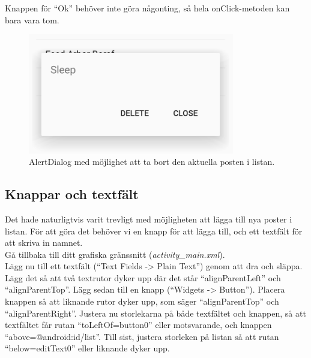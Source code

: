 \documentclass[11 pt, titlepage]{article} %
\begin{document}
Knappen för “Ok” behöver inte göra någonting, så hela onClick-metoden kan bara vara tom.\\

\begin{figure}[ht!]

\centering

\includegraphics[width=90mm]{images/popup.png}

\caption{AlertDialog med möjlighet att ta bort den aktuella posten i listan.}

\label{overflow}

\end{figure}


\subsection{Knappar och textfält}
Det hade naturligtvis varit trevligt med möjligheten att lägga till nya poster i listan.
För att göra det behöver vi en knapp för att lägga till, och ett textfält för att skriva in namnet.\\

Gå tillbaka till ditt grafiska gränssnitt (\textit{activity\_main.xml}).\\
Lägg nu till ett textfält (``Text Fields -> Plain Text'') genom att dra och släppa. Lägg det så att två textrutor dyker upp där det står ``alignParentLeft'' och ``alignParentTop''.
Lägg sedan till en knapp (``Widgets -> Button'').
Placera knappen så att liknande rutor dyker upp, som säger ``alignParentTop'' och ``alignParentRight''.
Justera nu storlekarna på både textfältet och knappen, så att textfältet får rutan ``toLeftOf=button0'' eller motsvarande, och knappen ``above=@android:id/list''.
Till sist, justera storleken på listan så att rutan ``below=editText0'' eller liknande dyker upp.\\
\end{document}
